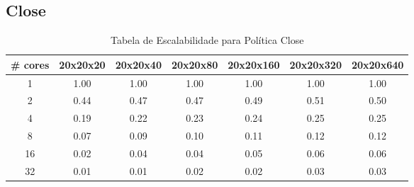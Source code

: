 \documentclass[a4paper, 12pt]{article}
\begin{document}
	\subsection{Close}
	\begin{table}[h!]
		\centering
		\begin{tabular}{|c|c|c|c|c|c|c|}
			\hline
			\textbf{\# cores} & \textbf{20x20x20} & \textbf{20x20x40} & \textbf{20x20x80} & \textbf{20x20x160} & \textbf{20x20x320} & \textbf{20x20x640} \\ \hline
			1                 & 1.00              & 1.00              & 1.00              & 1.00               & 1.00               & 1.00               \\ \hline
			2                 & 0.44              & 0.47              & 0.47              & 0.49               & 0.51               & 0.50               \\ \hline
			4                 & 0.19              & 0.22              & 0.23              & 0.24               & 0.25               & 0.25               \\ \hline
			8                 & 0.07              & 0.09              & 0.10              & 0.11               & 0.12               & 0.12               \\ \hline
			16                & 0.02              & 0.04              & 0.04              & 0.05               & 0.06               & 0.06               \\ \hline
			32                & 0.01              & 0.01              & 0.02              & 0.02               & 0.03               & 0.03               \\ \hline
		\end{tabular}
		\caption{Tabela de Escalabilidade para Política Close}
		\label{tab:Tabela de Escalabilidade para Política Close}
	\end{table}

	
	\FloatBarrier
	
\end{document}
